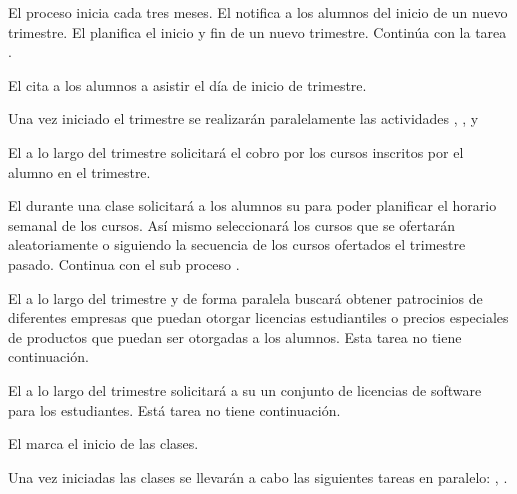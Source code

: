 \begin{PDescripcion}
	\Ppaso[\EinicioTiempo] El proceso inicia cada tres meses. El  notifica a los alumnos del inicio de un nuevo trimestre.
	\Ppaso[\PSubProceso] El  planifica el inicio y fin de un nuevo trimestre. Continúa con la tarea .
	
	\Ppaso[\PSubProceso] El  cita a los alumnos a asistir el día de inicio de trimestre.
	
	\Ppaso[\iCompuerta] Una vez iniciado el trimestre se realizarán paralelamente las actividades , ,  y 
	
	\Ppaso[\PSubProceso]  El  a lo largo del trimestre solicitará el cobro por los cursos inscritos por el alumno en el trimestre.
	
	\Ppaso[\PSubProceso]  El  durante una clase solicitará a los alumnos su  para poder planificar el horario semanal de los cursos. Así mismo seleccionará los cursos que se ofertarán aleatoriamente o siguiendo la secuencia de los cursos ofertados el trimestre pasado. Continua con el sub proceso .
	
	\Ppaso[\PSubProceso]  El  a lo largo del trimestre y de forma paralela buscará obtener patrocinios de diferentes empresas que puedan otorgar licencias estudiantiles o precios especiales de productos que puedan ser otorgadas a los alumnos. Esta tarea no tiene continuación.
	
	\Ppaso[\PSubProceso]  El  a lo largo del trimestre solicitará a su  un conjunto de licencias de software para los estudiantes. Está tarea no tiene continuación.
	
	\Ppaso[\PSubProceso]  El  marca el inicio de las clases.
	
	\Ppaso[\iCompuerta] Una vez iniciadas las clases se llevarán a cabo las siguientes tareas en paralelo: , .
	

\end{PDescripcion}
